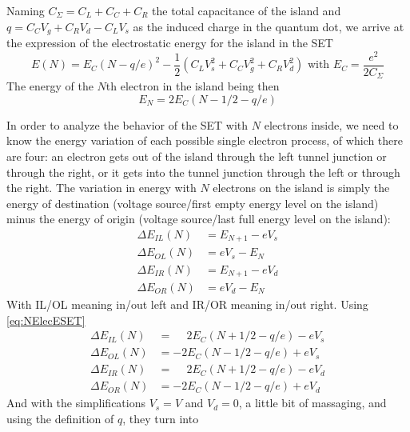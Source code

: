 \documentclass[../main.tex]{subfiles}
\begin{document}
Naming \(C_{\Sigma} = C_{L} + C_{C} + C_{R}\) the total capacitance of the
island and \(q = C_{C}V_{g} + C_{R}V_{d} - C_{L}V_{s}\) as the induced charge
in the quantum dot, we arrive at the expression of the electrostatic energy
for the island in the SET
\begin{equation*}
\label{eq:ElecESET}
    E(N) = E_{C}(N - q/e)^2
             - \frac{1}{2}\left(C_{L}V_{s}^2 + C_{C}V_{g}^2 + C_{R}V_{d}^2\right)
             \text{ with } E_{C} = \frac{e^2}{2 C_{\Sigma}}
\end{equation*}
The energy of the \(N\)th electron in the island being then
\begin{equation}
\label{eq:NElecESET}
    E_{N} = 2E_{C}(N - 1/2 - q/e)
\end{equation}

In order to analyze the behavior of the SET with \(N\) electrons inside, we
need to know the energy variation of each possible single electron process,
of which there are four: an electron gets out of the island through the
left tunnel junction or through the right, or it gets into the tunnel junction
through the left or through the right. The variation in energy with \(N\)
electrons on the island is simply the energy of destination (voltage
source/first empty energy level on the island) minus the energy of origin
(voltage source/last full energy level on the island):
\begin{align*}
    \Delta E_{IL}(N) &= E_{N+1} - eV_{s}\\
    \Delta E_{OL}(N) &= eV_{s} - E_{N}\\
    \Delta E_{IR}(N) &= E_{N + 1} - eV_{d}\\
    \Delta E_{OR}(N) &= eV_{d} - E_{N}
\end{align*}
With IL/OL meaning in/out left and IR/OR meaning in/out right. Using \ref{eq:NElecESET}
\begin{align*}
    \Delta E_{IL}(N) &= \phantom{-}2E_{C}(N + 1/2 - q/e) - eV_{s}\\
    \Delta E_{OL}(N) &= -2E_{C}(N - 1/2 - q/e) + eV_{s}\\
    \Delta E_{IR}(N) &= \phantom{-}2E_{C}(N + 1/2 - q/e) - eV_{d}\\
    \Delta E_{OR}(N) &= -2E_{C}(N - 1/2 - q/e) + eV_{d}
\end{align*}
And with the simplifications \(V_{s} =  V\) and \(V_{d} = 0\), a little
bit of massaging, and using the definition of \(q\), they turn into
\end{document}
